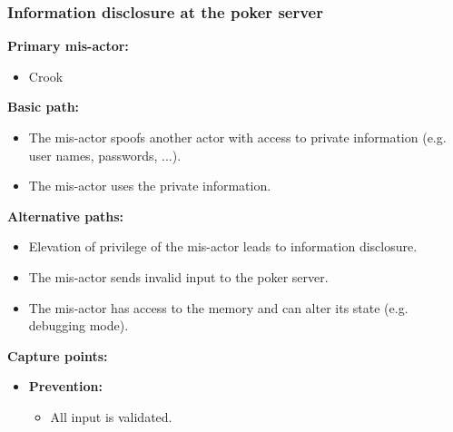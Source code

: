 \documentclass[a4paper,11pt]{report}
\begin{document}
\subsubsection{Information disclosure at the poker server}
\textbf{Primary mis-actor:}
\begin{itemize}
\item Crook
\end{itemize}
\textbf{Basic path:}
\begin{itemize}
\item The mis-actor spoofs another actor with access to private information (e.g. user names, passwords, ...).
\item The mis-actor uses the private information.
\end{itemize}
\textbf{Alternative paths:}
\begin{itemize}
\item Elevation of privilege of the mis-actor leads to information disclosure.
\item The mis-actor sends invalid input to the poker server.
\item The mis-actor has access to the memory and can alter its state (e.g. debugging mode).
\end{itemize}
\textbf{Capture points:}
\begin{itemize}
\item \textbf{Prevention:}
\begin{itemize}
\item All input is validated.
\end{itemize}
\end{itemize}
\end{document}
